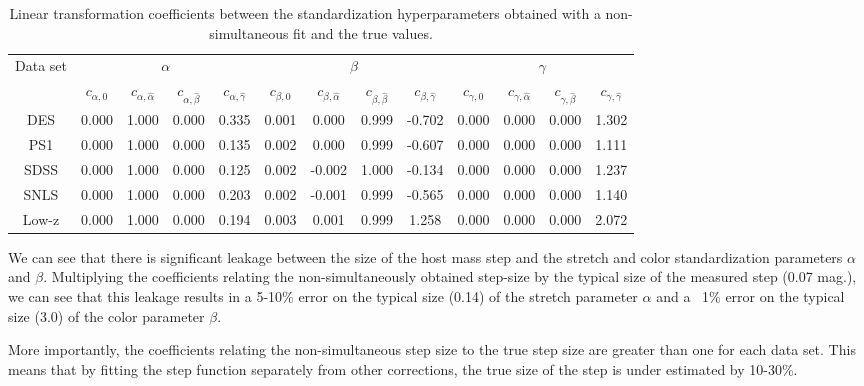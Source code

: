 \begin{table}[htbp]
\centering
    \begin{tabular}{ccccccccccccc}\toprule
    \multirow{2}{*}{Data set} &
    \multicolumn{4}{c}{$\alpha$} &
    \multicolumn{4}{c}{$\beta$} &
    \multicolumn{4}{c}{$\gamma$} \\
       {}  &  $c_{\alpha, 0}$ & $c_{\alpha,\hat{\alpha}}$ & $c_{\alpha,\hat{\beta}}$ & $c_{\alpha,\hat{\gamma}}$
       &  $c_{\beta, 0}$ &  $c_{\beta,\hat{\alpha}}$ & $c_{\beta,\hat{\beta}}$ & $c_{\beta,\hat{\gamma}}$
       &  $c_{\gamma, 0}$ &  $c_{\gamma,\hat{\alpha}}$ & $c_{\gamma,\hat{\beta}}$ & $c_{\gamma,\hat{\gamma}}$ \\\midrule
        DES
        & 0.000 & 1.000 & 0.000 & 0.335
        & 0.001 & 0.000 & 0.999 & -0.702
        & 0.000 & 0.000 & 0.000 & 1.302
        \\
        PS1
        & 0.000 & 1.000 & 0.000 & 0.135
        & 0.002 & 0.000 & 0.999 & -0.607
        & 0.000 & 0.000 & 0.000 & 1.111
        \\
        SDSS
        & 0.000 & 1.000 & 0.000 & 0.125
        & 0.002 & -0.002 & 1.000 & -0.134
        & 0.000 & 0.000 & 0.000 & 1.237
        \\
        SNLS
        & 0.000 & 1.000 & 0.000 & 0.203
        & 0.002 & -0.001 & 0.999 & -0.565
        & 0.000 & 0.000 & 0.000 & 1.140
        \\
        Low-z
        & 0.000 & 1.000 & 0.000 & 0.194
        & 0.003 & 0.001 & 0.999 & 1.258
        & 0.000 & 0.000 & 0.000 & 2.072
        \\\bottomrule
    \end{tabular}
    \caption{Linear transformation coefficients between the standardization hyperparameters obtained with a non-simultaneous fit and the true values.}
    \label{tab:trans}
\end{table}

We can see that there is significant leakage between the size of the host mass step and the stretch and color standardization parameters $\alpha$ and $\beta$. Multiplying the coefficients relating the non-simultaneously obtained step-size by the typical size of the measured step (0.07 mag.), we can see that this leakage results in a 5-10\% error on the typical size (0.14) of the stretch parameter $\alpha$ and a ~1\% error on the typical size (3.0) of the color parameter $\beta$.

More importantly, the coefficients relating the non-simultaneous step size to the true step size are greater than one for each data set. This means that by fitting the step function separately from other corrections, the true size of the step is under estimated by 10-30\%.

